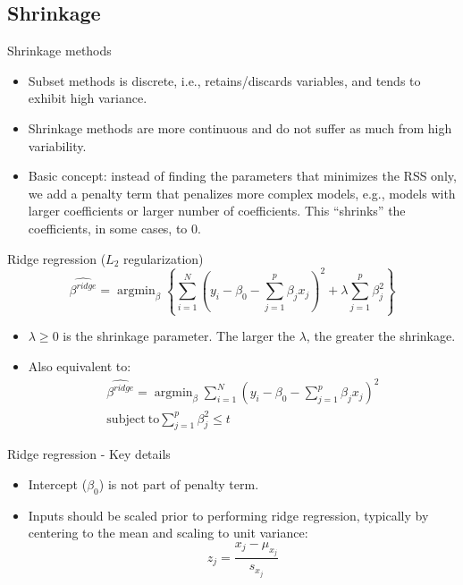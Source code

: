 \documentclass[aspectratio=169]{beamer}
\DeclareMathOperator*{\argmin}{argmin}
\begin{document}
\subsection{Shrinkage}

\begin{frame}{Shrinkage methods}
    \begin{itemize}
        \item Subset methods is discrete, i.e., retains/discards variables, and tends to exhibit high variance.
        \item Shrinkage methods are more continuous and do not suffer as much from high variability.
        \item Basic concept: instead of finding the parameters that minimizes the RSS only, we add a penalty term that penalizes more complex models, e.g., models with larger coefficients or larger number of coefficients. This ``shrinks'' the coefficients, in some cases, to 0.
    \end{itemize}
\end{frame}


\begin{frame}{Ridge regression ($L_2$ regularization)}
    \begin{equation*}
        \hat{\beta^{ridge}} = \argmin_\beta \left \{ \sum_{i=1}^N (y_i - \beta_0 - \sum_{j=1}^p \beta_j x_j)^2 + \lambda \sum_{j=1}^p \beta_j^2 \right \}
    \end{equation*}
    \begin{itemize}
        \item $\lambda \geq 0$ is the shrinkage parameter. The larger the $\lambda$, the greater the shrinkage.
        \item Also equivalent to:
        \begin{eqnarray*}
        \hat{\beta^{ridge}} = \argmin_\beta \sum_{i=1}^N (y_i - \beta_0 - \sum_{j=1}^p \beta_j x_j)^2\\
        \mathrm{subject~to} \sum_{j=1}^p \beta_j^2 \leq t
        \end{eqnarray*}
    \end{itemize}
\end{frame}


\begin{frame}{Ridge regression - Key details}
    \begin{itemize}
        \item Intercept ($\beta_0$) is not part of penalty term.
        \item Inputs should be scaled prior to performing ridge regression, typically by centering to the mean and scaling to unit variance:
        \begin{equation*}
            z_j = \frac{x_j - \mu_{x_j}}{s_{x_j}}
        \end{equation*}
    \end{itemize}
\end{frame} 
\end{document}
